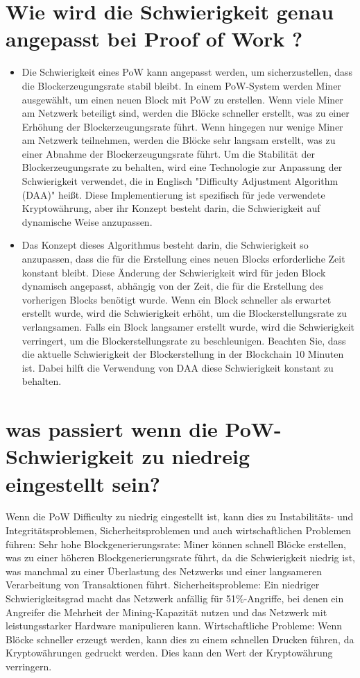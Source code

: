 \documentclass[ngerman]{scrreprt}
\begin{document}
\section{Wie wird die Schwierigkeit genau angepasst bei Proof of Work ?}
\begin{itemize}
	\item Die Schwierigkeit eines PoW kann angepasst werden, um sicherzustellen, dass die Blockerzeugungsrate stabil bleibt. In einem PoW-System werden Miner ausgewählt, um einen neuen Block mit PoW zu erstellen. Wenn viele Miner am Netzwerk beteiligt sind, werden die Blöcke schneller erstellt, was zu einer Erhöhung der Blockerzeugungsrate führt. Wenn hingegen nur wenige Miner am Netzwerk teilnehmen, werden die Blöcke sehr langsam erstellt, was zu einer Abnahme der Blockerzeugungsrate führt. Um die Stabilität der Blockerzeugungsrate zu behalten, wird eine Technologie zur Anpassung der Schwierigkeit verwendet, die in Englisch "Difficulty Adjustment Algorithm (DAA)" heißt. Diese Implementierung ist spezifisch für jede verwendete Kryptowährung, aber ihr Konzept besteht darin, die Schwierigkeit auf dynamische Weise anzupassen. 
	
	\item Das Konzept dieses Algorithmus besteht darin, die Schwierigkeit so anzupassen, dass die für die Erstellung eines neuen Blocks erforderliche Zeit konstant bleibt. Diese Änderung der Schwierigkeit wird für jeden Block dynamisch angepasst, abhängig von der Zeit, die für die Erstellung des vorherigen Blocks benötigt wurde. Wenn ein Block schneller als erwartet erstellt wurde, wird die Schwierigkeit erhöht, um die Blockerstellungsrate zu verlangsamen. Falls ein Block langsamer erstellt wurde, wird die Schwierigkeit verringert, um die Blockerstellungsrate zu beschleunigen. Beachten Sie, dass die aktuelle Schwierigkeit der Blockerstellung in der Blockchain 10 Minuten ist. Dabei hilft die Verwendung von DAA diese Schwierigkeit konstant zu behalten.
\end{itemize}
\section{was passiert wenn die PoW-Schwierigkeit zu niedreig eingestellt sein?}
Wenn die PoW Difficulty zu niedrig eingestellt ist, kann dies zu Instabilitäts- und Integritätsproblemen, Sicherheitsproblemen und auch wirtschaftlichen Problemen führen:
Sehr hohe Blockgenerierungsrate: Miner können schnell Blöcke erstellen, was zu einer höheren Blockgenerierungsrate führt, da die Schwierigkeit niedrig ist, was manchmal zu einer Überlastung des Netzwerks und einer langsameren Verarbeitung von Transaktionen führt.
Sicherheitsprobleme: Ein niedriger Schwierigkeitsgrad macht das Netzwerk anfällig für 51\%-Angriffe, bei denen ein Angreifer die Mehrheit der Mining-Kapazität nutzen und das Netzwerk mit leistungsstarker Hardware manipulieren kann. 
Wirtschaftliche Probleme: Wenn Blöcke schneller erzeugt werden, kann dies zu einem schnellen Drucken führen, da Kryptowährungen gedruckt werden. Dies kann den Wert der Kryptowährung verringern.
\end{document}

